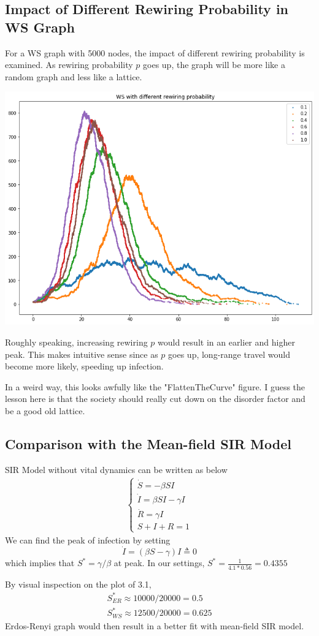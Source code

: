 \documentclass[12pt]{article}
\theoremstyle{definition}
\begin{document}
\subsection{Impact of Different Rewiring Probability in WS Graph}
For a WS graph with 5000 nodes, the impact of different rewiring probability is examined. As rewiring probability $p$ goes up, the graph will be more like a random graph and less like a lattice.
\begin{center}
    \includegraphics[scale=0.6]{images/rewiring.png}
\end{center}
Roughly speaking, increasing rewiring $p$ would result in an earlier and higher peak. This makes intuitive sense since as $p$ goes up, long-range travel would become more likely, speeding up infection. 

In a weird way, this looks awfully like the "FlattenTheCurve" figure. I guess the lesson here is that the society should really cut down on the disorder factor and be a good old lattice. 

\subsection{Comparison with the Mean-field SIR Model}
SIR Model without vital dynamics can be written as below
\begin{align*}
    \begin{cases}
        \dot{S} = -\beta SI\\
        \dot{I} = \beta SI - \gamma I\\
        \dot{R} = \gamma I\\
        S+I+R = 1
    \end{cases}
\end{align*}
We can find the peak of infection by setting 
\[\dot{I} = (\beta S - \gamma) I \triangleq 0\]
which implies that $S^* = \gamma / \beta$ at peak. In our settings, $S^* = \frac{1}{4.1 * 0.56} = 0.4355$

By visual inspection on the plot of 3.1, 
\begin{align*}
    S^*_{ER} \approx 10000/20000 = 0.5\\
    S^*_{WS} \approx 12500/20000 = 0.625
\end{align*}
Erdos-Renyi graph would then result in a better fit with mean-field SIR model. 



\end{document}
